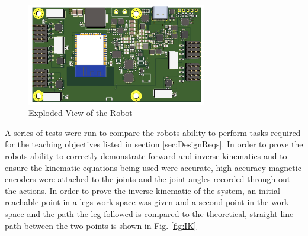 \documentclass[12pt]{report}
\begin{document}
\begin{figure}
        \centering
        \includegraphics[width = 0.7\textwidth]{Images/Motherboard.png}
        \caption{Exploded View of the Robot}
        \label{fig:ExplodedView}
    \end{figure}
A series of tests were run to compare the robots ability to perform tasks required for the teaching objectives listed in section \ref{sec:DesignReqs}. In order to prove the robots ability to correctly demonstrate forward and inverse kinematics and to ensure the kinematic equations being used were accurate, high accuracy magnetic encoders were attached to the joints and the joint angles recorded through out the actions. In order to prove the inverse kinematic of the system, an initial reachable point in a legs work space was given and a second point in the work space  and the path the leg followed is compared to the theoretical, straight line path between the two points is shown in Fig. \ref{fig:IK}
\end{document}
